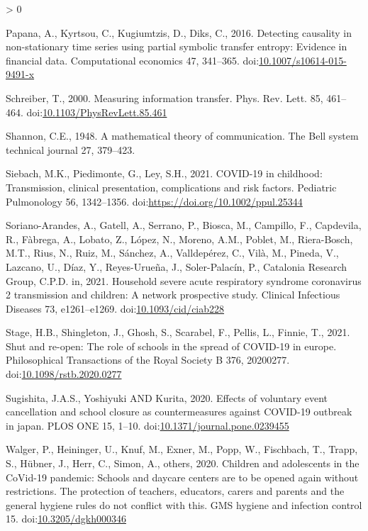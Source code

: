\documentclass[]{elsarticle} %
\newlength{\cslhangindent}
\newenvironment{CSLReferences}[2] %
 {%
  \setlength{\parindent}{0pt}
  \ifodd #1 \everypar{\setlength{\hangindent}{\cslhangindent}}\ignorespaces\fi
  \ifnum #2 > 0
  \setlength{\parskip}{#2\baselineskip}
  \fi
 }%
 {}
\begin{document}
\begin{CSLReferences}{1}{0}
\leavevmode\hypertarget{ref-papana2016detecting}{}%
Papana, A., Kyrtsou, C., Kugiumtzis, D., Diks, C., 2016. Detecting causality in non-stationary time series using partial symbolic transfer entropy: Evidence in financial data. Computational economics 47, 341--365. doi:\href{https://doi.org/10.1007/s10614-015-9491-x}{10.1007/s10614-015-9491-x}

\leavevmode\hypertarget{ref-schreiber2000measuring}{}%
Schreiber, T., 2000. Measuring information transfer. Phys. Rev. Lett. 85, 461--464. doi:\href{https://doi.org/10.1103/PhysRevLett.85.461}{10.1103/PhysRevLett.85.461}

\leavevmode\hypertarget{ref-shannon1948mathematical}{}%
Shannon, C.E., 1948. A mathematical theory of communication. The Bell system technical journal 27, 379--423.

\leavevmode\hypertarget{ref-siebach2021childhood}{}%
Siebach, M.K., Piedimonte, G., Ley, S.H., 2021. COVID-19 in childhood: Transmission, clinical presentation, complications and risk factors. Pediatric Pulmonology 56, 1342--1356. doi:\url{https://doi.org/10.1002/ppul.25344}

\leavevmode\hypertarget{ref-sorianoarandes2021household}{}%
Soriano-Arandes, A., Gatell, A., Serrano, P., Biosca, M., Campillo, F., Capdevila, R., Fàbrega, A., Lobato, Z., López, N., Moreno, A.M., Poblet, M., Riera-Bosch, M.T., Rius, N., Ruiz, M., Sánchez, A., Valldepérez, C., Vilà, M., Pineda, V., Lazcano, U., Díaz, Y., Reyes-Urueña, J., Soler-Palacín, P., Catalonia Research Group, C.P.D. in, 2021. Household severe acute respiratory syndrome coronavirus 2 transmission and children: A network prospective study. Clinical Infectious Diseases 73, e1261--e1269. doi:\href{https://doi.org/10.1093/cid/ciab228}{10.1093/cid/ciab228}

\leavevmode\hypertarget{ref-stage2021shut}{}%
Stage, H.B., Shingleton, J., Ghosh, S., Scarabel, F., Pellis, L., Finnie, T., 2021. Shut and re-open: The role of schools in the spread of COVID-19 in europe. Philosophical Transactions of the Royal Society B 376, 20200277. doi:\href{https://doi.org/10.1098/rstb.2020.0277}{10.1098/rstb.2020.0277}

\leavevmode\hypertarget{ref-yoshiyuki2020effects}{}%
Sugishita, J.A.S., Yoshiyuki AND Kurita, 2020. Effects of voluntary event cancellation and school closure as countermeasures against COVID-19 outbreak in japan. PLOS ONE 15, 1--10. doi:\href{https://doi.org/10.1371/journal.pone.0239455}{10.1371/journal.pone.0239455}

\leavevmode\hypertarget{ref-walger2020children}{}%
Walger, P., Heininger, U., Knuf, M., Exner, M., Popp, W., Fischbach, T., Trapp, S., Hübner, J., Herr, C., Simon, A., others, 2020. Children and adolescents in the CoVid-19 pandemic: Schools and daycare centers are to be opened again without restrictions. The protection of teachers, educators, carers and parents and the general hygiene rules do not conflict with this. GMS hygiene and infection control 15. doi:\href{https://doi.org/10.3205/dgkh000346}{10.3205/dgkh000346}


\end{CSLReferences}
\end{document}
